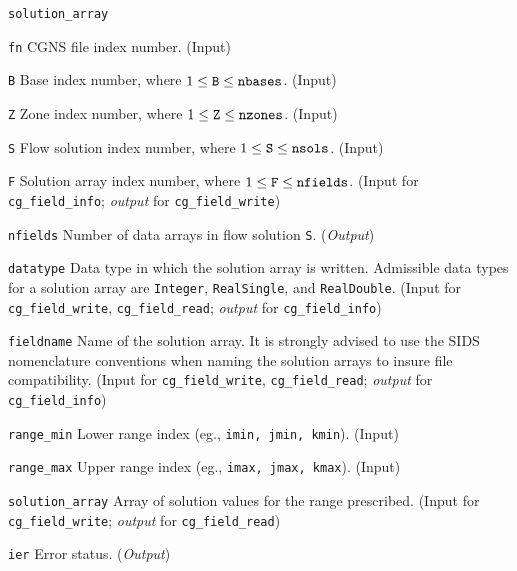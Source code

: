 \begin{Ventryi}{\texttt{solution\_array}}\raggedright
\item [\texttt{fn}]
      CGNS file index number.
      (\textcolor{input}{Input})
\item [\texttt{B}]
      Base index number, where $1 \leq \text{\texttt{B}} \leq \text{\texttt{nbases}}$.
      (\textcolor{input}{Input})
\item [\texttt{Z}]
      Zone index number, where $1 \leq \text{\texttt{Z}} \leq \text{\texttt{nzones}}$.
      (\textcolor{input}{Input})
\item [\texttt{S}]
      Flow solution index number, where $1 \leq \text{\texttt{S}} \leq \text{\texttt{nsols}}$.
      (\textcolor{input}{Input})
\item [\texttt{F}]
      Solution array index number, where $1 \leq \text{\texttt{F}} \leq \text{\texttt{nfields}}$.
      (\textcolor{input}{Input} for \texttt{cg\_field\_info};
      \textcolor{output}{\textit{output}} for \texttt{cg\_field\_write})
\item [\texttt{nfields}]
      Number of data arrays in flow solution \texttt{S}.
      (\textcolor{output}{\textit{Output}})
\item [\texttt{datatype}]
      Data type in which the solution array is written.
      Admissible data types for a solution array are \texttt{Integer},
      \texttt{RealSingle}, and \texttt{RealDouble}.
      (\textcolor{input}{Input} for \texttt{cg\_field\_write},
      \texttt{cg\_field\_read};
      \textcolor{output}{\textit{output}} for \texttt{cg\_field\_info})
\item [\texttt{fieldname}]
      Name of the solution array.
      It is strongly advised to use the SIDS nomenclature conventions
      when naming the solution arrays to insure file compatibility.
      (\textcolor{input}{Input} for \texttt{cg\_field\_write},
      \texttt{cg\_field\_read};
      \textcolor{output}{\textit{output}} for \texttt{cg\_field\_info})
\item [\texttt{range\_min}]
      Lower range index (eg., \texttt{imin, jmin, kmin}).
      (\textcolor{input}{Input})
\item [\texttt{range\_max}]
      Upper range index (eg., \texttt{imax, jmax, kmax}).
      (\textcolor{input}{Input})
\item [\texttt{solution\_array}]
      Array of solution values for the range prescribed.
      (\textcolor{input}{Input} for \texttt{cg\_field\_write};
      \textcolor{output}{\textit{output}} for \texttt{cg\_field\_read})
\item [\texttt{ier}]
      Error status.
      (\textcolor{output}{\textit{Output}})
\end{Ventryi}

